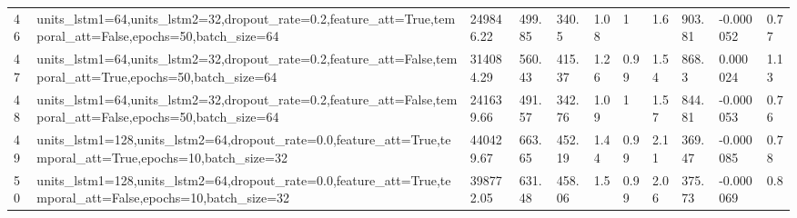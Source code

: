 \begin{longtable}{C{0.8cm} L{2cm} C{1.15cm} C{1.15cm} C{1.15cm} C{1.15cm} C{0.85cm} C{1.25cm} C{1.2cm} C{1.5cm} C{1.0cm}}
46 & units\_lstm1=64,\newline units\_lstm2=32,\newline dropout\_rate=0.2,\newline feature\_att=True,\newline temporal\_att=False,\newline epochs=50,\newline batch\_size=64 & 249846.22 & 499.85 & 340.5 & 1.08 & 1 & 1.6 & 903.81 & -0.000052 & 0.77 \\
47 & units\_lstm1=64,\newline units\_lstm2=32,\newline dropout\_rate=0.2,\newline feature\_att=False,\newline temporal\_att=True,\newline epochs=50,\newline batch\_size=64 & 314084.29 & 560.43 & 415.37 & 1.26 & 0.99 & 1.54 & 868.3 & 0.000024 & 1.13 \\
48 & units\_lstm1=64,\newline units\_lstm2=32,\newline dropout\_rate=0.2,\newline feature\_att=False,\newline temporal\_att=False,\newline epochs=50,\newline batch\_size=64 & 241639.66 & 491.57 & 342.76 & 1.09 & 1 & 1.57 & 844.81 & -0.000053 & 0.76 \\
49 & units\_lstm1=128,\newline units\_lstm2=64,\newline dropout\_rate=0.0,\newline feature\_att=True,\newline temporal\_att=True,\newline epochs=10,\newline batch\_size=32 & 440429.67 & 663.65 & 452.19 & 1.44 & 0.99 & 2.11 & 369.47 & -0.000085 & 0.78 \\
50 & units\_lstm1=128,\newline units\_lstm2=64,\newline dropout\_rate=0.0,\newline feature\_att=True,\newline temporal\_att=False,\newline epochs=10,\newline batch\_size=32 & 398772.05 & 631.48 & 458.06 & 1.5 & 0.99 & 2.06 & 375.73 & -0.000069 & 0.8 \\

\end{longtable}
